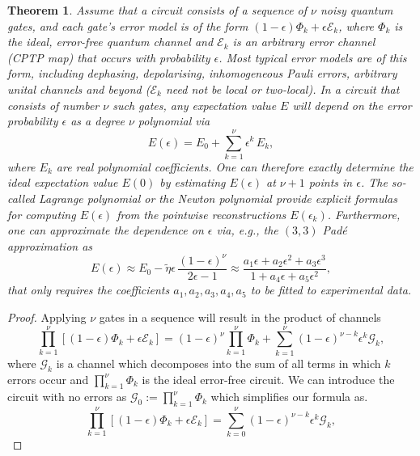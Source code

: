 \documentclass[aps,prx,showpacs,twocolumn,reprint]{revtex4-2}
\newtheorem{theorem}{Theorem}
\begin{document}
{\begin{theorem} \label{pade_theo}
	Assume that a circuit consists of a sequence of $\nu$ noisy quantum gates, and
	each gate's error model is of the form $(1-\epsilon) \Phi_{k} + \epsilon \mathcal{E}_k$,
	where $\Phi_{k}$ is the ideal, error-free quantum channel and $\mathcal{E}_k$ is 
	an arbitrary error channel (CPTP map) that occurs with probability $\epsilon$. Most typical error models 
	are of this form, including dephasing, depolarising, inhomogeneous Pauli errors,
	arbitrary unital channels and beyond ($\mathcal{E}_k$ need not be local or two-local).
	In a circuit that consists of number $\nu$ such gates, any expectation value $E$ will depend on the error probability $\epsilon$ as a
	degree $\nu$ polynomial via
	\begin{equation*}
	E (\epsilon)=	E_{0} + \sum_{k=1}^\nu \epsilon^k \, E_{k},
	\end{equation*}
	where $E_{k}$ are real polynomial coefficients. One can therefore exactly
	determine the ideal expectation value $E (0)$ by estimating $E (\epsilon)$
	at $\nu+1$ points in $\epsilon$. The so-called Lagrange polynomial or the Newton polynomial
	provide explicit formulas for computing $E(\epsilon)$ from
	the pointwise reconstructions $E(\epsilon_k)$. Furthermore, one can approximate the dependence
	on $\epsilon$  via, e.g.,  the $(3,3)$ Pad{\'e} approximation as
	\begin{equation}
	E (\epsilon) \approx  E_0  - \tilde{\eta} \epsilon	\, \frac{(1 - \epsilon)^{ \nu} }{ 2  \epsilon-1 }
	\approx	\frac{a_1 \epsilon  + a_2 \epsilon^2 + a_3 \epsilon^3
	}{ 1 + a_4 \epsilon + a_5 \epsilon^2
	},
	\end{equation}
	that only requires the coefficients $a_1, a_2, a_3, a_4, a_5$ to be
	fitted to experimental data.
\end{theorem}
\begin{proof}
	Applying $\nu$ gates in a sequence will result in the
	product of channels
	\begin{equation}
	\prod_{k=1}^\nu [ (1-\epsilon) \Phi_{k} + \epsilon \mathcal{E}_k ]
	 =
	 (1-\epsilon)^\nu \prod_{k=1}^\nu \Phi_k + \sum_{k=1}^\nu (1-\epsilon)^{\nu-k} \epsilon^k \mathcal{G}_k,
	\end{equation}
	where $\mathcal{G}_k$ is a channel which decomposes into the sum of all terms in which $k$ errors occur and
	$\prod_{k=1}^\nu \Phi_k $ is the ideal error-free circuit. 	We can introduce the circuit with no errors as
	$\mathcal{G}_0:= \prod_{k=1}^\nu \Phi_k$ which simplifies our formula as.
	\begin{equation}
	\prod_{k=1}^\nu [ (1-\epsilon) \Phi_{k} + \epsilon \mathcal{E}_k ]
	=
	 \sum_{k=0}^\nu (1-\epsilon)^{\nu-k} \epsilon^k \mathcal{G}_k,
	\end{equation}
	

\end{proof}}
\end{document}
